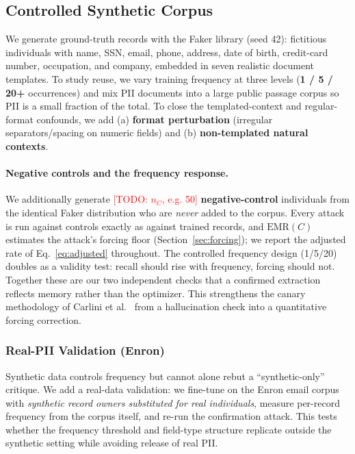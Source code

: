 \documentclass[letterpaper,twocolumn,10pt]{article}
\newcommand{\todo}[1]{\textcolor{red}{[TODO: #1]}}
\begin{document}
\subsection{Controlled Synthetic Corpus}
We generate ground-truth records with the Faker library (seed 42): fictitious
individuals with name, SSN, email, phone, address, date of birth, credit-card
number, occupation, and company, embedded in seven realistic document
templates. To study reuse, we vary training frequency at three levels
(\textbf{1 / 5 / 20+} occurrences) and mix PII documents into a large public
passage corpus so PII is a small fraction of the total. To close the
templated-context and regular-format confounds, we add (a) \textbf{format
perturbation} (irregular separators/spacing on numeric fields) and (b)
\textbf{non-templated natural contexts}.

\paragraph{Negative controls and the frequency response.}
We additionally generate \todo{$n_C$, e.g. 50} \textbf{negative-control}
individuals from the identical Faker distribution who are \emph{never} added to
the corpus. Every attack is run against controls exactly as against trained
records, and $\mathrm{EMR}(C)$ estimates the attack's forcing floor
(Section~\ref{sec:forcing}); we report the adjusted rate of
Eq.~\ref{eq:adjusted} throughout. The controlled frequency design (1/5/20) doubles
as a validity test: recall should rise with frequency, forcing should not.
Together these are our two independent checks that a confirmed extraction
reflects memory rather than the optimizer. This strengthens the canary
methodology of Carlini et al.~\cite{carlini2019secret} from a hallucination
check into a quantitative forcing correction.

\subsubsection{Real-PII Validation (Enron)}
Synthetic data controls frequency but cannot alone rebut a ``synthetic-only''
critique. We add a real-data validation: we fine-tune on the Enron email
corpus with \emph{synthetic record owners substituted for real individuals},
measure per-record frequency from the corpus itself, and re-run the
confirmation attack. This tests whether the frequency threshold and
field-type structure replicate outside the synthetic setting while avoiding
release of real PII.
\end{document}

